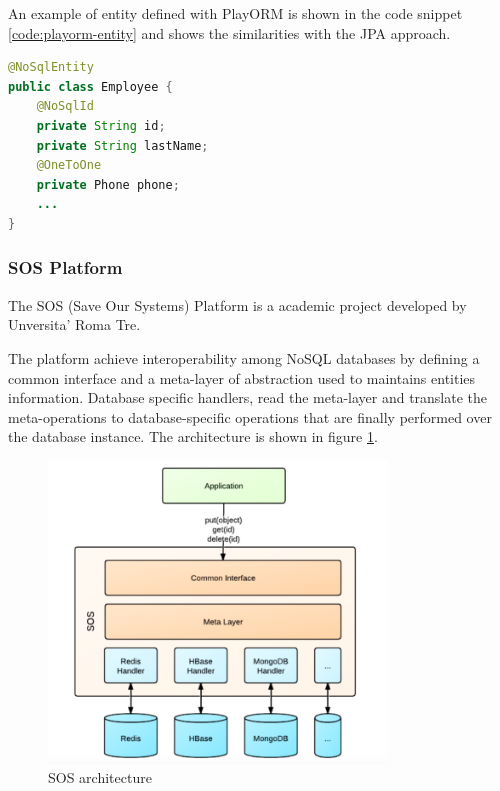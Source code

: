 \noindent An example of entity defined with PlayORM is shown in the code snippet \ref{code:playorm-entity} and shows the similarities with the JPA approach.

\begin{lstlisting}[language=Java, caption=PlayORM object mapping, label=code:playorm-entity]
@NoSqlEntity
public class Employee {
    @NoSqlId
    private String id;
    private String lastName;
    @OneToOne
    private Phone phone;
    ...
}
\end{lstlisting}

\subsubsection{SOS Platform}
The SOS (Save Our Systems) Platform \cite{paper:sos-platform} is a academic project developed by Unversita' Roma Tre.

\noindent The platform achieve interoperability among NoSQL databases by defining a common interface  and a meta-layer of abstraction used to maintains entities information. Database specific handlers, read the meta-layer and translate the meta-operations to database-specific operations that are finally performed over the database instance.
The architecture is shown in figure \ref{fig:sos-architecture}.

\begin{figure}[tbh]
  \centering
  \includegraphics[width=9cm]{images/sos_architecture}
  \caption{SOS architecture \cite{paper:sos-platform}}
  \label{fig:sos-architecture}
\end{figure}

